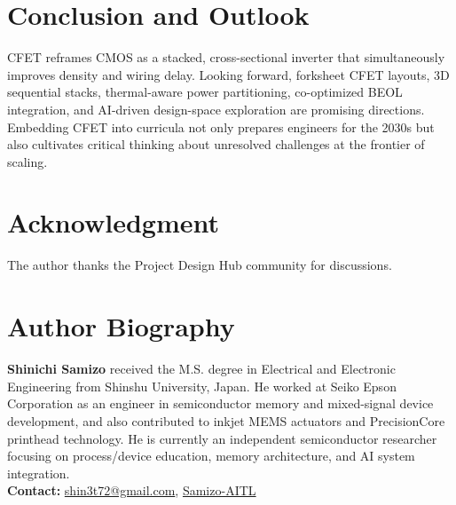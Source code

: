 \documentclass[conference]{IEEEtran}
\begin{document}
\section{Conclusion and Outlook}
CFET reframes CMOS as a stacked, cross-sectional inverter that simultaneously improves density and wiring delay.
Looking forward, forksheet CFET layouts, 3D sequential stacks, thermal-aware power partitioning, co-optimized BEOL integration, and AI-driven design-space exploration are promising directions.
Embedding CFET into curricula not only prepares engineers for the 2030s but also cultivates critical thinking about unresolved challenges at the frontier of scaling.

\section*{Acknowledgment}
The author thanks the Project Design Hub community for discussions.




\section*{Author Biography}
\noindent\textbf{Shinichi Samizo}
received the M.S. degree in Electrical and Electronic Engineering from Shinshu University, Japan.
He worked at Seiko Epson Corporation as an engineer in semiconductor memory and mixed-signal device development, and also contributed to inkjet MEMS actuators and PrecisionCore printhead technology.
He is currently an independent semiconductor researcher focusing on process/device education, memory architecture, and AI system integration.\\[2pt]
\textbf{Contact:} \href{mailto:shin3t72@gmail.com}{shin3t72@gmail.com}, \href{https://github.com/Samizo-AITL}{Samizo-AITL}
\end{document}
